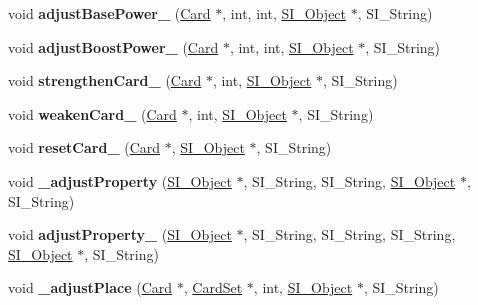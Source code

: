 \begin{DoxyCompactItemize}
\mbox{\label{class_field_aa295489317a238a7643f319144dfe659}} 
void {\bfseries adjust\+Base\+Power\+\_\+} (\hyperlink{class_card}{Card} $\ast$, int, int, \hyperlink{class_s_i___object}{S\+I\+\_\+\+Object} $\ast$, S\+I\+\_\+\+String)
\item 
\mbox{\label{class_field_aaae73d69aaa1cb5aad00484ed9ce6586}} 
void {\bfseries adjust\+Boost\+Power\+\_\+} (\hyperlink{class_card}{Card} $\ast$, int, int, \hyperlink{class_s_i___object}{S\+I\+\_\+\+Object} $\ast$, S\+I\+\_\+\+String)
\item 
\mbox{\label{class_field_ad0f65b89ffd91f3aa8aa799aef2e6047}} 
void {\bfseries strengthen\+Card\+\_\+} (\hyperlink{class_card}{Card} $\ast$, int, \hyperlink{class_s_i___object}{S\+I\+\_\+\+Object} $\ast$, S\+I\+\_\+\+String)
\item 
\mbox{\label{class_field_a7d40832908002f6409cb12d1fd016d3e}} 
void {\bfseries weaken\+Card\+\_\+} (\hyperlink{class_card}{Card} $\ast$, int, \hyperlink{class_s_i___object}{S\+I\+\_\+\+Object} $\ast$, S\+I\+\_\+\+String)
\item 
\mbox{\label{class_field_a4300601ffa2827c566c3cb443c72ecf6}} 
void {\bfseries reset\+Card\+\_\+} (\hyperlink{class_card}{Card} $\ast$, \hyperlink{class_s_i___object}{S\+I\+\_\+\+Object} $\ast$, S\+I\+\_\+\+String)
\item 
\mbox{\label{class_field_a2eeae06fb4f3d41a817002130b2c4f2a}} 
void {\bfseries \+\_\+adjust\+Property} (\hyperlink{class_s_i___object}{S\+I\+\_\+\+Object} $\ast$, S\+I\+\_\+\+String, S\+I\+\_\+\+String, \hyperlink{class_s_i___object}{S\+I\+\_\+\+Object} $\ast$, S\+I\+\_\+\+String)
\item 
\mbox{\label{class_field_adb1848f229231acf8aa09d7b05d54d35}} 
void {\bfseries adjust\+Property\+\_\+} (\hyperlink{class_s_i___object}{S\+I\+\_\+\+Object} $\ast$, S\+I\+\_\+\+String, S\+I\+\_\+\+String, S\+I\+\_\+\+String, \hyperlink{class_s_i___object}{S\+I\+\_\+\+Object} $\ast$, S\+I\+\_\+\+String)
\item 
\mbox{\label{class_field_abed423933bd92ba4f2c5aa787ec09726}} 
void {\bfseries \+\_\+adjust\+Place} (\hyperlink{class_card}{Card} $\ast$, \hyperlink{class_card_set}{Card\+Set} $\ast$, int, \hyperlink{class_s_i___object}{S\+I\+\_\+\+Object} $\ast$, S\+I\+\_\+\+String)

\end{DoxyCompactItemize}
